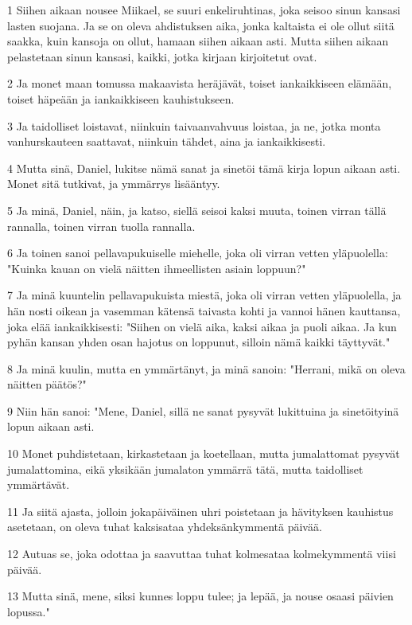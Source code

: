 \par 1 Siihen aikaan nousee Miikael, se suuri enkeliruhtinas, joka seisoo sinun kansasi lasten suojana. Ja se on oleva ahdistuksen aika, jonka kaltaista ei ole ollut siitä saakka, kuin kansoja on ollut, hamaan siihen aikaan asti. Mutta siihen aikaan pelastetaan sinun kansasi, kaikki, jotka kirjaan kirjoitetut ovat.
\par 2 Ja monet maan tomussa makaavista heräjävät, toiset iankaikkiseen elämään, toiset häpeään ja iankaikkiseen kauhistukseen.
\par 3 Ja taidolliset loistavat, niinkuin taivaanvahvuus loistaa, ja ne, jotka monta vanhurskauteen saattavat, niinkuin tähdet, aina ja iankaikkisesti.
\par 4 Mutta sinä, Daniel, lukitse nämä sanat ja sinetöi tämä kirja lopun aikaan asti. Monet sitä tutkivat, ja ymmärrys lisääntyy.
\par 5 Ja minä, Daniel, näin, ja katso, siellä seisoi kaksi muuta, toinen virran tällä rannalla, toinen virran tuolla rannalla.
\par 6 Ja toinen sanoi pellavapukuiselle miehelle, joka oli virran vetten yläpuolella: "Kuinka kauan on vielä näitten ihmeellisten asiain loppuun?"
\par 7 Ja minä kuuntelin pellavapukuista miestä, joka oli virran vetten yläpuolella, ja hän nosti oikean ja vasemman kätensä taivasta kohti ja vannoi hänen kauttansa, joka elää iankaikkisesti: "Siihen on vielä aika, kaksi aikaa ja puoli aikaa. Ja kun pyhän kansan yhden osan hajotus on loppunut, silloin nämä kaikki täyttyvät."
\par 8 Ja minä kuulin, mutta en ymmärtänyt, ja minä sanoin: "Herrani, mikä on oleva näitten päätös?"
\par 9 Niin hän sanoi: "Mene, Daniel, sillä ne sanat pysyvät lukittuina ja sinetöityinä lopun aikaan asti.
\par 10 Monet puhdistetaan, kirkastetaan ja koetellaan, mutta jumalattomat pysyvät jumalattomina, eikä yksikään jumalaton ymmärrä tätä, mutta taidolliset ymmärtävät.
\par 11 Ja siitä ajasta, jolloin jokapäiväinen uhri poistetaan ja hävityksen kauhistus asetetaan, on oleva tuhat kaksisataa yhdeksänkymmentä päivää.
\par 12 Autuas se, joka odottaa ja saavuttaa tuhat kolmesataa kolmekymmentä viisi päivää.
\par 13 Mutta sinä, mene, siksi kunnes loppu tulee; ja lepää, ja nouse osaasi päivien lopussa."


